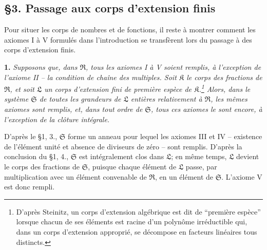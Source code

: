 \providecommand{\mR}{\mathfrak{R}}
\providecommand{\mK}{\mathfrak{K}}
\providecommand{\mL}{\mathfrak{L}}
\providecommand{\mS}{\mathfrak{S}}
\providecommand{\mC}{\mathfrak{C}}
\providecommand{\mF}{\mathfrak{F}}
\providecommand{\mc}{\mathfrak{c}}

\subsection*{\S{}3. Passage aux corps d'extension finis}

Pour situer les corps de nombres et de fonctions, il reste à montrer comment les axiomes I à V formulés dans l'introduction se transfèrent lors du passage à des corps d'extension finis.

\textbf{1.} \emph{Supposons que, dans $\mR$, tous les axiomes I à V soient remplis, à l'exception de l'axiome II -- la condition de chaîne des multiples. Soit $\mK$ le corps des fractions de $\mR$, et soit $\mL$ un corps d'extension fini de première espèce de $\mK$.\footnote{D'après Steinitz, un corps d'extension algébrique est dit de ``première espèce'' lorsque chacun de ses éléments est racine d'un polynôme irréductible qui, dans un corps d'extension approprié, se décompose en facteurs linéaires tous distincts.} Alors, dans le système $\mS$ de toutes les grandeurs de $\mL$ entières relativement à $\mR$, les mêmes axiomes sont remplis, et, dans tout ordre de $\mS$, tous ces axiomes le sont encore, à l'exception de la clôture intégrale.}

D'après le \S{}1, 3., $\mS$ forme un anneau pour lequel les axiomes III et IV -- existence de l'élément unité et absence de diviseurs de zéro -- sont remplis. D'après la conclusion du \S{}1, 4., $\mS$ est intégralement clos dans $\mL$; en même temps, $\mL$ devient le corps des fractions de $\mS$, puisque chaque élément de $\mL$ passe, par multiplication avec un élément convenable de $\mR$, en un élément de $\mS$. L'axiome V est donc rempli.

